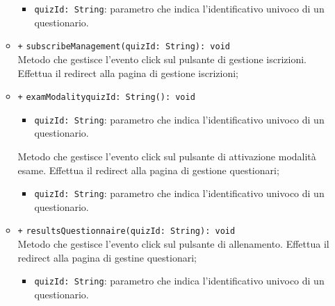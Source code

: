 \begin{itemize}
\begin{itemize}
\begin{itemize}
										\item \texttt{quizId: String}: parametro che indica l'identificativo univoco di un questionario.
									\end{itemize}
									\item \texttt{+} \texttt{subscribeManagement(quizId: String): void} \\
									Metodo che gestisce l’evento click sul pulsante di gestione iscrizioni. Effettua il redirect alla pagina di gestione iscrizioni;
									\item \texttt{+} \texttt{examModalityquizId: String(): void} \\
									\begin{itemize}
										\item \texttt{quizId: String}: parametro che indica l'identificativo univoco di un questionario.
									\end{itemize}
									Metodo che gestisce l’evento click sul pulsante di attivazione modalità esame. Effettua il redirect alla pagina di gestione questionari;
									\begin{itemize}
										\item \texttt{quizId: String}: parametro che indica l'identificativo univoco di un questionario.
									\end{itemize}
									\item \texttt{+} \texttt{resultsQuestionnaire(quizId: String): void} \\
									Metodo che gestisce l’evento click sul pulsante di allenamento. Effettua il redirect alla pagina di gestine questionari;
									\begin{itemize}
										\item \texttt{quizId: String}: parametro che indica l'identificativo univoco di un questionario.
									\end{itemize}   
								\end{itemize}
							\end{itemize}	
